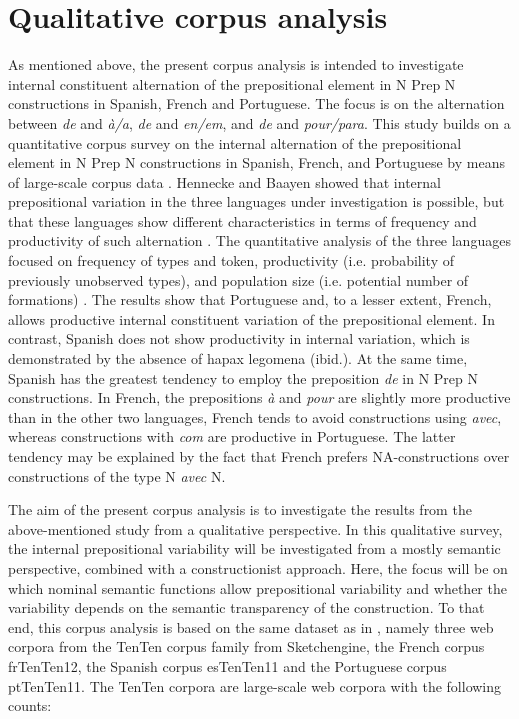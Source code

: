 \documentclass[output=paper]{langsci/langscibook}
\begin{document}
\section{Qualitative corpus analysis}
 As mentioned above, the present corpus analysis is intended to investigate internal constituent alternation of the prepositional element in N Prep N constructions in Spanish, French and Portuguese. The focus is on the alternation between \textit{de} and \textit{à/a}, \textit{de} and \textit{en/em}, and \textit{de} and \textit{pour/para}. This study builds on a quantitative corpus survey on the internal alternation of the prepositional element in N Prep N constructions in Spanish, French, and Portuguese by means of large-scale corpus data \citep{Hennecke:2017}. Hennecke and Baayen showed that internal prepositional variation in the three languages under investigation is possible, but that these languages show different characteristics in terms of frequency and productivity of such alternation \citep[144]{Hennecke:2017}. The quantitative analysis of the three languages focused on frequency of types and token, productivity (i.e. probability of previously unobserved types), and population size (i.e. potential number of formations) \citep[139]{Hennecke:2017}. The results show that Portuguese and, to a lesser extent, French, allows productive internal constituent variation of the prepositional element. In contrast, Spanish does not show productivity in internal variation, which is demonstrated by the absence of hapax legomena (ibid.). At the same time, Spanish has the greatest tendency to employ the preposition \textit{de} in N Prep N constructions. In French, the prepositions \textit{à} and \textit{pour} are slightly more productive than in the other two languages, French tends to avoid constructions using \textit{avec}, whereas constructions with \textit{com} are productive in Portuguese. The latter tendency may be explained by the fact that French prefers NA-constructions over constructions of the type N \textit{avec} N.
 
The aim of the present corpus analysis is to investigate the results from the above-mentioned study from a qualitative perspective. In this qualitative survey, the internal prepositional variability will be investigated from a mostly semantic perspective, combined with a constructionist approach. Here, the focus will be on which nominal semantic functions allow prepositional variability and whether the variability depends on the semantic transparency of the construction. To that end, this corpus analysis is based on the same dataset as in \citet{Hennecke:2017}, namely three web corpora from the TenTen corpus family from Sketchengine, the French corpus frTenTen12, the Spanish corpus esTenTen11 and the Portuguese corpus ptTenTen11. The TenTen corpora are large-scale web corpora with the following counts:\\
\end{document}
